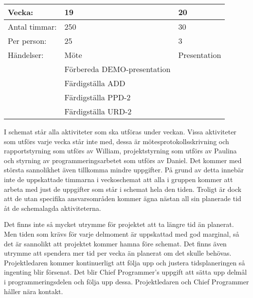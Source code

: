 \begin{tabular}{ | p{65pt} || p{110pt} | p{233pt} |}
  \hline
  Vecka: & 19 & 20 \\ \hline
  Antal timmar: & 250 & 30 \\ \hline
  Per person: & 25 & 3 \\ \hline
  Händelser: & Möte & Presentation\\ \hline
  & Förbereda DEMO-presentation &\\ \hline
  & Färdigställa ADD &\\ \hline
  & Färdigställa PPD-2 &\\ \hline
  & Färdigställa URD-2 &\\ \hline
\end{tabular}

I schemat står alla aktiviteter som ska utföras under veckan. Vissa aktiviteter som utförs varje vecka står inte med, dessa är mötesprotokollsskrivning och rapportstyrning som utförs av William, projektstyrning som utförs av Paulina och styrning av programmeringsarbetet som utförs av Daniel. Det kommer med största sannolikhet även tillkomma mindre uppgifter. På grund av detta innebär inte de uppskattade timmarna i veckoschemat att alla i gruppen kommer att arbeta med just de uppgifter som står i schemat hela den tiden. Troligt är dock att de utan specifika ansvarsområden kommer ägna nästan all sin planerade tid åt de schemalagda aktiviteterna. 

Det finns inte så mycket utrymme för projektet att ta längre tid än planerat. Men tiden som krävs för varje delmoment är uppskattad med god marginal, så det är sannolikt att projektet kommer hamna före schemat. Det finns även utrymme att spendera mer tid per vecka än planerat om det skulle behövas. Projektledaren kommer kontinuerligt att följa upp och justera tidsplaneringen så ingenting blir försenat. Det blir Chief Programmer’s uppgift att sätta upp delmål i programmeringsdelen och följa upp dessa. Projektledaren och Chief Programmer håller nära kontakt.
